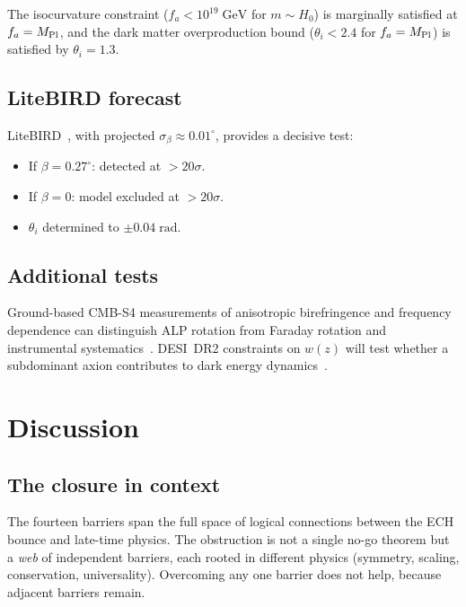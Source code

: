 \documentclass[aps,prd,twocolumn,superscriptaddress,showpacs,preprintnumbers,nofootinbib,longbibliography,floatfix]{revtex4-2}
\newcommand{\MPl}{M_{\rm Pl}}
\begin{document}
The isocurvature constraint ($f_a < 10^{19}\;\mathrm{GeV}$ for $m \sim H_0$)
is marginally satisfied at $f_a = \MPl$, and the dark matter overproduction
bound ($\theta_i < 2.4$ for $f_a = \MPl$) is satisfied by
$\theta_i = 1.3$.

\subsection{LiteBIRD forecast}

LiteBIRD~\cite{LiteBIRD}, with projected $\sigma_\beta \approx 0.01^\circ$,
provides a decisive test:
%
\begin{itemize}[leftmargin=*]
\item If $\beta = 0.27^\circ$: detected at $> 20\sigma$.
\item If $\beta = 0$: model excluded at $> 20\sigma$.
\item $\theta_i$ determined to $\pm 0.04\;\mathrm{rad}$.
\end{itemize}

\subsection{Additional tests}

Ground-based CMB-S4 measurements of anisotropic birefringence and
frequency dependence can distinguish ALP rotation from Faraday rotation and
instrumental systematics~\cite{SPIDER2025}.  DESI~DR2 constraints on
$w(z)$ will test whether a subdominant axion contributes to dark energy
dynamics~\cite{DESI2024,Nakagawa2025}.


\section{Discussion}\label{sec:discussion}

\subsection{The closure in context}

The fourteen barriers span the full space of logical connections between the
ECH bounce and late-time physics.  The obstruction is not a single no-go
theorem but a \emph{web} of independent barriers, each rooted in different
physics (symmetry, scaling, conservation, universality).  Overcoming any one
barrier does not help, because adjacent barriers remain.
\end{document}
